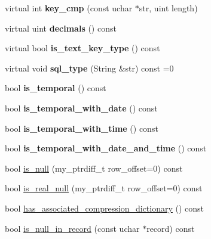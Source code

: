 \begin{DoxyCompactItemize}
\item 
\mbox{\label{classField_a9366bd06d2b0dc686b520b15f2ab4662}} 
virtual int {\bfseries key\+\_\+cmp} (const uchar $\ast$str, uint length)
\item 
\mbox{\label{classField_a26e931e30d55459189ded3d11b586dd2}} 
virtual uint {\bfseries decimals} () const
\item 
\mbox{\label{classField_aa3c9b65256cc513b7c2b95292a6e14a3}} 
virtual bool {\bfseries is\+\_\+text\+\_\+key\+\_\+type} () const
\item 
\mbox{\label{classField_af2a73d649875b07e77ac4a8660b56f9e}} 
virtual void {\bfseries sql\+\_\+type} (String \&str) const =0
\item 
\mbox{\label{classField_ab9fc0072012db29e7dc0ae494bca182b}} 
bool {\bfseries is\+\_\+temporal} () const
\item 
\mbox{\label{classField_ad69b08e1d683d02a51a58bf2a56b3098}} 
bool {\bfseries is\+\_\+temporal\+\_\+with\+\_\+date} () const
\item 
\mbox{\label{classField_ae432f833f942d4e9affc7e9d2a27a939}} 
bool {\bfseries is\+\_\+temporal\+\_\+with\+\_\+time} () const
\item 
\mbox{\label{classField_aa7f8ac88aa35895221e5901c5469dfde}} 
bool {\bfseries is\+\_\+temporal\+\_\+with\+\_\+date\+\_\+and\+\_\+time} () const
\item 
bool \mbox{\hyperlink{classField_a220543dc491ed2921e8dbde49c83a57f}{is\+\_\+null}} (my\+\_\+ptrdiff\+\_\+t row\+\_\+offset=0) const
\item 
bool \mbox{\hyperlink{classField_a4886fe451c5ef6136740b0c0cd78e2ed}{is\+\_\+real\+\_\+null}} (my\+\_\+ptrdiff\+\_\+t row\+\_\+offset=0) const
\item 
bool \mbox{\hyperlink{classField_a7a242ebc5829a40ee3bf17a2cf06cf94}{has\+\_\+associated\+\_\+compression\+\_\+dictionary}} () const
\item 
bool \mbox{\hyperlink{classField_a55777ad76c9c2349f1ce29f5d39606e0}{is\+\_\+null\+\_\+in\+\_\+record}} (const uchar $\ast$record) const
\item 

\end{DoxyCompactItemize}
